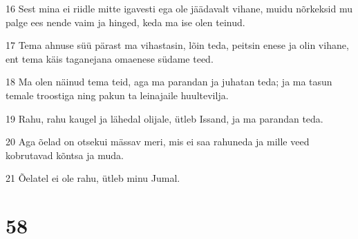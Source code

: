 \par 16 Sest mina ei riidle mitte igavesti ega ole jäädavalt vihane, muidu nõrkeksid mu palge ees nende vaim ja hinged, keda ma ise olen teinud.
\par 17 Tema ahnuse süü pärast ma vihastasin, lõin teda, peitsin enese ja olin vihane, ent tema käis taganejana omaenese südame teed.
\par 18 Ma olen näinud tema teid, aga ma parandan ja juhatan teda; ja ma tasun temale troostiga ning pakun ta leinajaile huultevilja.
\par 19 Rahu, rahu kaugel ja lähedal olijale, ütleb Issand, ja ma parandan teda.
\par 20 Aga õelad on otsekui mässav meri, mis ei saa rahuneda ja mille veed kobrutavad kõntsa ja muda.
\par 21 Õelatel ei ole rahu, ütleb minu Jumal.

\chapter{58}

